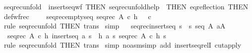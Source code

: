 \begin{isabellebody}
\isamarkupfalse%
%
\endisatagproof
{\isafoldproof}%
%
\isadelimproof
\isanewline
%
\endisadelimproof
\isanewline
{}\isamarkupfalse%
\ seq{\isacharunderscore}rec{\isacharunderscore}unfold\ {\isacharequal}\ insertseq{\isacharunderscore}wf\ {\isacharbrackleft}THEN\ seq{\isacharunderscore}rec{\isacharunderscore}unfold{\isacharunderscore}help\ {\isacharbrackleft}\ THEN\ eq{\isacharunderscore}reflection\ {\isacharbrackleft}THEN\ def{\isacharunderscore}wfrec{\isacharbrackright}{\isacharbrackright}{\isacharbrackright}\isanewline
\ \isanewline
\ \isanewline
{}\isamarkupfalse%
\ seq{\isacharunderscore}rec{\isacharunderscore}emptyseq{\isacharcolon}\ {\isachardoublequoteopen}seq{\isacharunderscore}rec\ A\ c\ h\ {\isacharpercent}{\isacharless}{\isacharpercent}{\isachargreater}\ {\isacharequal}\ c{\isachardoublequoteclose}\isanewline
%
\isadelimproof
%
\endisadelimproof
%
\isatagproof
{}\isamarkupfalse%
\ {\isacharparenleft}rule\ seq{\isacharunderscore}rec{\isacharunderscore}unfold\ {\isacharbrackleft}THEN\ trans{\isacharbrackright}{\isacharparenright}\isanewline
{}\isamarkupfalse%
\ simp\isanewline
{}\isamarkupfalse%
%
\endisatagproof
{\isafoldproof}%
%
\isadelimproof
\ \isanewline
%
\endisadelimproof
\isanewline
{}\isamarkupfalse%
\ seq{\isacharunderscore}rec{\isacharunderscore}insertseq{\isacharcolon}\ {\isachardoublequoteopen}{\isacharbang}{\isacharbang}s{\isachardot}\ {\isacharbrackleft}{\isacharbar}\ s{\isacharcolon}\ seq\ A{\isacharsemicolon}\ a{\isacharcolon}A{\isacharbar}{\isacharbrackright}\ {\isacharequal}{\isacharequal}{\isachargreater}\ \ \isanewline
\ \ seq{\isacharunderscore}rec\ A\ c\ h\ {\isacharparenleft}insertseq\ a\ s{\isacharparenright}\ {\isacharequal}\ h\ a\ s\ {\isacharparenleft}seq{\isacharunderscore}rec\ A\ c\ h\ s{\isacharparenright}{\isachardoublequoteclose}\isanewline
%
\isadelimproof
%
\endisadelimproof
%
\isatagproof
{}\isamarkupfalse%
\ {\isacharparenleft}rule\ seq{\isacharunderscore}rec{\isacharunderscore}unfold\ {\isacharbrackleft}THEN\ trans{\isacharbrackright}{\isacharparenright}\isanewline
{}\isamarkupfalse%
\ {\isacharparenleft}simp\ {\isacharparenleft}no{\isacharunderscore}asm{\isacharunderscore}simp{\isacharparenright}\ add{\isacharcolon}\ insertseq{\isacharunderscore}relI\ cut{\isacharunderscore}apply{\isacharparenright}\isanewline
{}\isamarkupfalse%
%
\endisatagproof
{\isafoldproof}%
%
\isadelimproof
\isanewline
%
\endisadelimproof
\isanewline
\isanewline
{}\isamarkupfalse%

\end{isabellebody}
